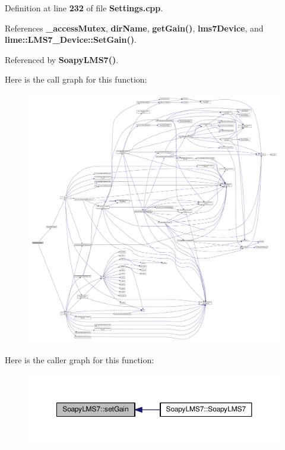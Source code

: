 Definition at line {\bf 232} of file {\bf Settings.\+cpp}.



References {\bf \+\_\+access\+Mutex}, {\bf dir\+Name}, {\bf get\+Gain()}, {\bf lms7\+Device}, and {\bf lime\+::\+L\+M\+S7\+\_\+\+Device\+::\+Set\+Gain()}.



Referenced by {\bf Soapy\+L\+M\+S7()}.



Here is the call graph for this function\+:
\nopagebreak
\begin{figure}[H]
\begin{center}
\leavevmode
\includegraphics[width=350pt]{d9/d90/classSoapyLMS7_ac7dee88fdc416b8852dd53f39edeb81d_cgraph}
\end{center}
\end{figure}




Here is the caller graph for this function\+:
\nopagebreak
\begin{figure}[H]
\begin{center}
\leavevmode
\includegraphics[width=350pt]{d9/d90/classSoapyLMS7_ac7dee88fdc416b8852dd53f39edeb81d_icgraph}
\end{center}
\end{figure}


